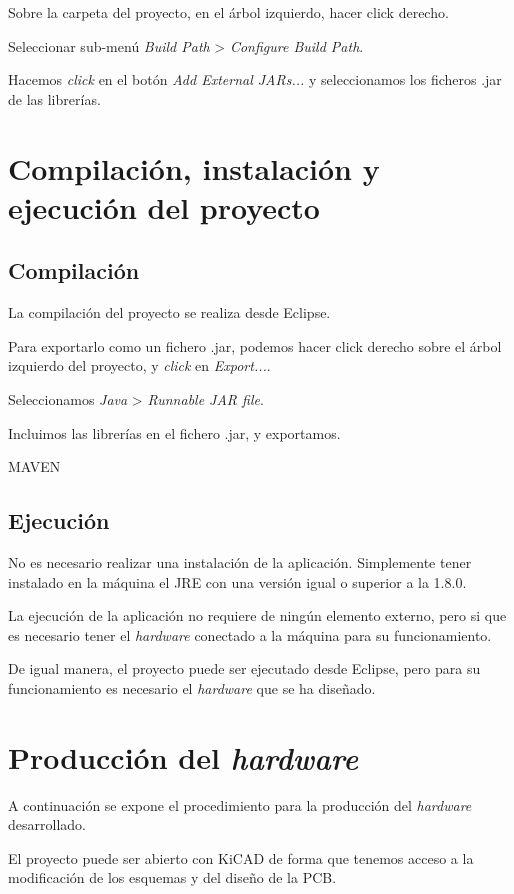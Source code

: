 Sobre la carpeta del proyecto, en el árbol izquierdo, hacer click derecho.

Seleccionar sub-menú \emph{Build Path} > \emph{Configure Build Path}.

Hacemos \emph{click} en el botón \emph{Add External JARs...} y seleccionamos los ficheros .jar de las librerías.


\section{Compilación, instalación y ejecución del proyecto}


\subsection{Compilación}
La compilación del proyecto se realiza desde Eclipse. 

Para exportarlo como un fichero .jar, podemos hacer click derecho sobre el árbol izquierdo del proyecto, y \emph{click} en \emph{Export...}.

Seleccionamos \emph{Java} > \emph{Runnable JAR file}.

Incluimos las librerías en el fichero .jar, y exportamos.

MAVEN

\subsection{Ejecución}

No es necesario realizar una instalación de la aplicación. Simplemente tener instalado en la máquina el JRE con una versión igual o superior a la 1.8.0.

La ejecución de la aplicación no requiere de ningún elemento externo, pero si que es necesario tener el \emph{hardware} conectado a la máquina para su funcionamiento.

De igual manera, el proyecto puede ser ejecutado desde Eclipse, pero para su funcionamiento es necesario el \emph{hardware} que se ha diseñado.

\section{Producción del \emph{hardware}}

A continuación se expone el procedimiento para la producción del \emph{hardware} desarrollado.

El proyecto puede ser abierto con KiCAD de forma que tenemos acceso a la modificación de los esquemas y del diseño de la PCB.

